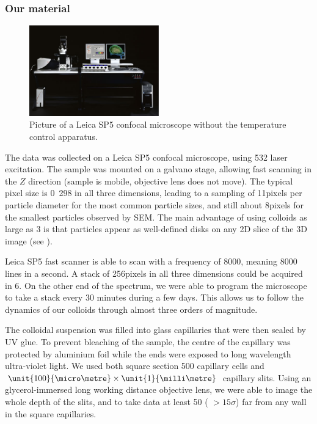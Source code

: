 \subsubsection{Our material}
%
\begin{figure}
	\centering
	\includegraphics[width=0.5\textwidth]{Leica_SP5}
	\caption{Picture of a Leica SP5 confocal microscope without the temperature control apparatus.}
	\label{fig:Confocal}
\end{figure}


The data was collected on a Leica SP5 confocal microscope, using \unit{532}{\nano\meter} laser excitation. The sample was mounted on a galvano stage, allowing fast scanning in the $Z$ direction (sample is mobile, objective lens does not move). The typical pixel size is \unit{0.298}{\nano\meter} in all three dimensions, leading to a sampling of \unit{11}{pixels} per particle diameter for the most common particle sizes, and still about \unit{8}{pixels} for the smallest particles observed by SEM. The main advantage of using colloids as large as \unit{3}{\micro\meter} is that particles appear as well-defined disks on any 2D slice of the 3D image (see ).

Leica SP5 fast scanner is able to scan with a frequency of \unit{8000}{\hertz}, meaning 8000 lines in a second. A stack of \unit{256}{pixels} in all three dimensions could be acquired in \unit{6}{\second}. On the other end of the spectrum, we were able to program the microscope to take a stack every 30 minutes during a few days. This allows us to follow the dynamics of our colloids through almost three orders of magnitude.

The colloidal suspension was filled into glass capillaries that were then sealed by UV glue. To prevent bleaching of the sample, the centre of the capillary was protected by aluminium foil while the ends were exposed to long wavelength ultra-violet light. We used both square section \unit{500}{\micro\metre} capillary cells and $\unit{100}{\micro\metre}\times\unit{1}{\milli\metre}$ capillary slits. Using an glycerol-immersed long working distance objective lens, we were able to image the whole depth of the slits, and to take data at least \unit{50}{\micro\meter} ( $>15\sigma$) far from any wall in the square capillaries.

